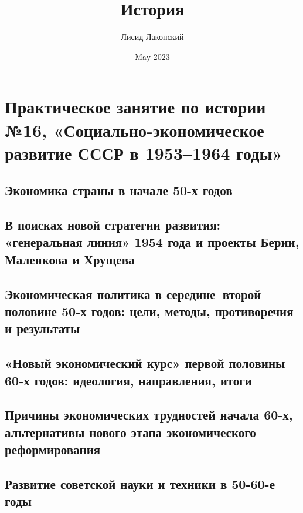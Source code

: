 \documentclass{article}
\title{История}
\author{Лисид Лаконский}
\date{May 2023}
\begin{document}
\raggedright

\maketitle
\tableofcontents
\pagebreak

\section{Практическое занятие по истории №16, «Социально-экономическое развитие СССР в 1953–1964 годы»}

\subsection{Экономика страны в начале 50-х годов}

\pagebreak
\subsection{В поисках новой стратегии развития: «генеральная линия» 1954 года и проекты Берии, Маленкова и Хрущева}

\pagebreak
\subsection{Экономическая политика в середине–второй половине 50-х годов: цели, методы, противоречия и результаты}

\pagebreak
\subsection{«Новый экономический курс» первой половины 60-х годов: идеология, направления, итоги}

\pagebreak
\subsection{Причины экономических трудностей начала 60-х, альтернативы нового этапа экономического реформирования}

\pagebreak
\subsection{Развитие советской науки и техники в 50-60-е годы}
\end{document}
